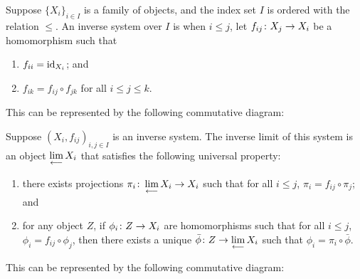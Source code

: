 \begin{definition}
    Suppose \({\{X_i\}}_{i \in I}\) is a family of objects,
    and the index set \(I\) is ordered with the relation \(\leq\).
    An inverse system over \(I\) is when \(i \leq j\),
    let \(f_{ij}\colon X_j\to X_i\) be a homomorphism such that
    \begin{enumerate}[label={(\roman*)}, itemsep=0mm]
        \item \(f_{ii} = \operatorname{id}_{X_i}\); and
        \item \(f_{ik} = f_{ij} \circ f_{jk}\) for all \(i \leq j \leq k\).
    \end{enumerate}

    This can be represented by the following commutative diagram:
    \begin{center}
    \end{center}
\end{definition}

\begin{definition}
    Suppose \({(X_i,f_{ij})}_{i,j \in I}\) is an inverse system.
    The inverse limit of this system is an object \(\operatorname{\displaystyle\lim_{\longleftarrow}} X_i\)
    that satisfies the following universal property:
    \begin{enumerate}[label={(\roman*)}, itemsep=0mm]
        \item there exists projections \(\pi_i\colon\operatorname{\displaystyle\lim_{\longleftarrow}} X_i\to X_i\)
            such that for all \(i \leq j\), \(\pi_i = f_{ij}\circ\pi_j\); and
        \item for any object \(Z\), if \(\phi_i\colon Z\to X_i\) are homomorphisms
            such that for all \(i \leq j\), \(\phi_i = f_{ij}\circ\phi_j\),
            then there exists a unique \(\bar{\phi}\colon Z\to\operatorname{\displaystyle\lim_{\longleftarrow}} X_i\)
            such that \(\phi_i = \pi_i\circ\bar{\phi}\).
    \end{enumerate}

    This can be represented by the following commutative diagram:
    \begin{center}
    \end{center}
\end{definition}





